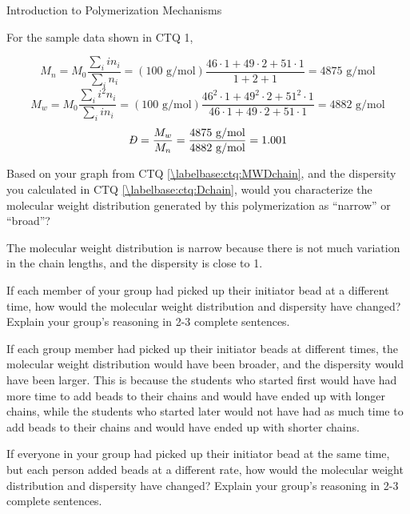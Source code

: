 \begin{activity}{Introduction to Polymerization Mechanisms}
\begin{ctqs}
\begin{solution}[2.5in]
{			For the sample data shown in CTQ 1,
			
			\begin{equation*}
				M_n = M_0\frac{\sum_i i n_i}{\sum_i n_i} = (100\text{ g/mol})\frac{46\cdot 1 + 49\cdot 2 + 51\cdot 1}{1+2+1} = 4875\text{ g/mol}
			\end{equation*}
			\begin{equation*}
				M_w = M_0\frac{\sum_i i^2 n_i}{\sum_i i n_i} = (100\text{ g/mol})\frac{46^2\cdot 1 + 49^2\cdot 2 + 51^2\cdot 1}{46\cdot 1 + 49\cdot 2 + 51\cdot 1} = 4882\text{ g/mol}
			\end{equation*}
			\begin{equation*}
				\PDImath = \frac{M_w}{M_n} = \frac{4875\text{ g/mol}}{4882\text{ g/mol}} = 1.001
			\end{equation*}
		}\end{solution}
	
	\question Based on your graph from CTQ \ref{\labelbase:ctq:MWDchain}, and the dispersity you calculated in CTQ \ref{\labelbase:ctq:Dchain}, would you characterize the molecular weight distribution generated by this polymerization as ``narrow'' or ``broad''?  %
	
		\begin{solution}[1in]
			The molecular weight distribution is narrow because there is not much variation in the chain lengths, and the dispersity is close to 1.
		\end{solution}
	
	\question If each member of your group had picked up their initiator bead at a different time, how would the molecular weight distribution and dispersity have changed?  Explain your group's reasoning in 2-3 complete sentences.
	
		\begin{solution}[1.9in]
			If each group member had picked up their initiator beads at different times, the molecular weight distribution would have been broader, and the dispersity would have been larger.  This is because the students who started first would have had more time to add beads to their chains and would have ended up with longer chains, while the students who started later would not have had as much time to add beads to their chains and would have ended up with shorter chains.
		\end{solution}
	
	\question If everyone in your group had picked up their initiator bead at the same time, but each person added beads at a different rate, how would the molecular weight distribution and dispersity have changed?  Explain your group's reasoning in 2-3 complete sentences.
	

\end{ctqs}
\end{activity}
